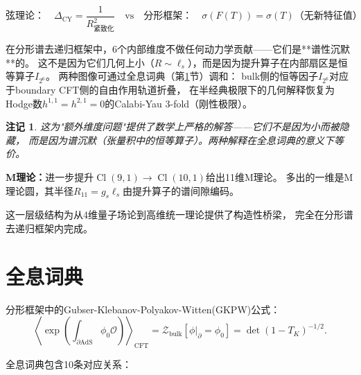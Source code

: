 \documentclass[12pt,a4paper]{ctexart}
\newtheorem{remark}[theorem]{注记}
\newcommand{\Cl}{\operatorname{Cl}}
\begin{document}
\[
\text{弦理论：}\quad \Delta_{\text{CY}} = \frac{1}{R^2_{\text{紧致化}}}
\quad\text{vs}\quad
\text{分形框架：}\quad \sigma(F(T)) = \sigma(T)\text{（无新特征值）}
\]

在分形谱去递归框架中，$6$个内部维度不做任何动力学贡献——它们是**谱性沉默**的。
这不是因为它们几何上小（$R \sim \ell_s$），而是因为提升算子在内部扇区是恒等算子$I_{2^6}$。
两种图像可通过全息词典（第\ref{sec:holography}节）调和：
bulk侧的恒等因子$I_{2^6}$对应于boundary CFT侧的自由作用轨道折叠，
在半经典极限下的几何解释恢复为Hodge数$h^{1,1}=h^{2,1}=0$的Calabi-Yau 3-fold（刚性极限）。

\begin{remark}
这为"额外维度问题"提供了数学上严格的解答——它们不是因为小而被隐藏，
而是因为谱沉默（张量积中的恒等算子）。两种解释在全息词典的意义下等价。
\end{remark}

\textbf{M理论：}进一步提升$\Cl(9,1) \to \Cl(10,1)$给出11维M理论。
多出的一维是M理论圆，其半径$R_{11} = g_s \ell_s$由提升算子的谱间隙编码。

这一层级结构为从4维量子场论到高维统一理论提供了构造性桥梁，
完全在分形谱去递归框架内完成。

\section{全息词典}
\label{sec:holography}

分形框架中的Gubser-Klebanov-Polyakov-Witten(GKPW)公式：
\begin{equation}
\left\langle \exp\left(\int_{\partial\text{AdS}} \phi_0 \mathcal{O}\right)\right\rangle_{\text{CFT}}
= \mathcal{Z}_{\text{bulk}}[\phi|_\partial = \phi_0] = \det(1 - T_K)^{-1/2}.
\end{equation}

全息词典包含10条对应关系：
\end{document}
